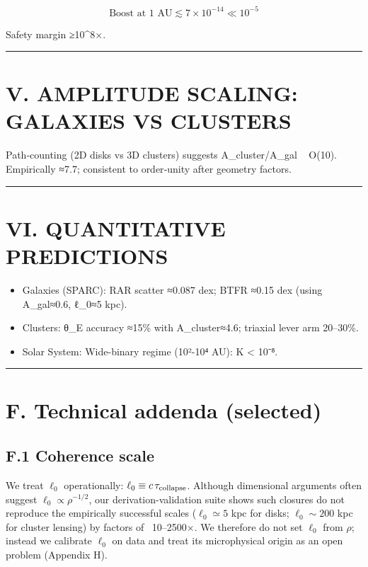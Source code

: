 \documentclass[11pt,a4paper]{article}
\begin{document}
\begin{equation}
\text{Boost at 1 AU} \lesssim 7\times 10^{-14} \ll 10^{-5}
\end{equation}

Safety margin ≥10^8×.


\medskip\hrule\medskip


\section{V. AMPLITUDE SCALING: GALAXIES VS CLUSTERS}


Path‑counting (2D disks vs 3D clusters) suggests A\_cluster/A\_gal ~ O(10). Empirically ≈7.7; consistent to order‑unity after geometry factors.


\medskip\hrule\medskip


\section{VI. QUANTITATIVE PREDICTIONS}


\begin{itemize}
\item Galaxies (SPARC): RAR scatter ≈0.087 dex; BTFR ≈0.15 dex (using A\_gal≈0.6, ℓ\_0≈5 kpc).
\item Clusters: θ\_E accuracy ≈15\% with A\_cluster≈4.6; triaxial lever arm 20–30\%.
\item Solar System: Wide-binary regime (10²-10⁴ AU): K < 10⁻⁸.
\end{itemize}


\medskip\hrule\medskip


\section{F. Technical addenda (selected)}


\subsection{F.1 Coherence scale}


We treat $\ell_0$ operationally: $\ell_0 \equiv c\,\tau_{\rm collapse}$. Although dimensional arguments often suggest $\ell_0 \propto \rho^{-1/2}$, our derivation-validation suite shows such closures do not reproduce the empirically successful scales ($\ell_0 \simeq 5$ kpc for disks; $\ell_0 \sim 200$ kpc for cluster lensing) by factors of ~10–2500×. We therefore do not set $\ell_0$ from $\rho$; instead we calibrate $\ell_0$ on data and treat its microphysical origin as an open problem (Appendix H).
\end{document}
